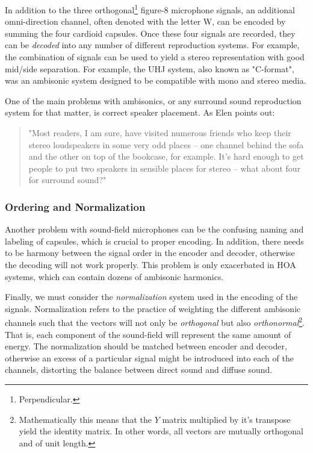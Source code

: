 In addition to the three orthogonal\footnote{Perpendicular.} figure-8 microphone signals, an additional omni-direction channel, often denoted with the letter W, can be encoded by summing the four cardioid capsules. Once these four signals are recorded, they can be \textit{decoded} into any number of different reproduction systems. For example, the combination of signals can be used to yield a stereo representation with good mid/side separation. For example, the UHJ system, also known as "C-format", was an ambisonic system designed to be compatible with mono and stereo media. 

One of the main problems with ambisonics, or any surround sound reproduction system for that matter, is correct speaker placement. As Elen \cite{elen1991whatever} points out:

\begin{quote}
    "Most readers, I am sure, have visited numerous friends who keep their stereo loudspeakers in some very odd places -- one channel behind the sofa and the other on top of the bookcase, for example. It’s hard enough to get people to put two speakers in sensible places for stereo -- what about four for surround sound?"
\end{quote}

\subsubsection{Ordering and Normalization}

Another problem with sound-field microphones can be the confusing naming and labeling of capsules, which is crucial to proper encoding. In addition, there needs to be harmony between the signal order in the encoder and decoder, otherwise the decoding will not work properly. This problem is only exacerbated in HOA systems, which can contain dozens of ambisonic harmonics. 

Finally, we must consider the \textit{normalization} system used in the encoding of the signals. Normalization refers to the practice of weighting the different ambisonic channels such that the vectors will not only be \textit{orthogonal} but also \textit{orthonormal}\footnote{Mathematically this means that the $Y$ matrix multiplied by it's transpose yield the identity matrix. In other words, all vectors are mutually orthogonal and of unit length.}. That is, each component of the sound-field will represent the same amount of energy. The normalization should be matched between encoder and decoder, otherwise an excess of a particular signal might be introduced into each of the channels, distorting the balance between direct sound and diffuse sound. 

